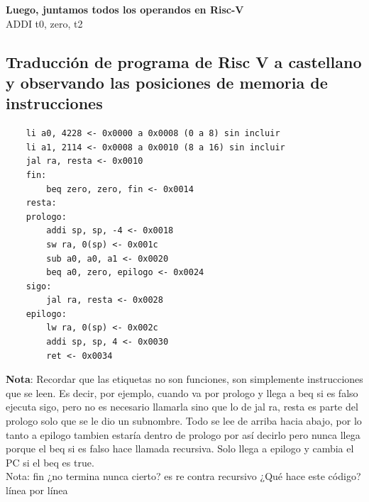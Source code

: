 \documentclass[10pt,a4paper]{article}
\begin{document}
\textbf{Luego, juntamos todos los operandos en Risc-V} \\ 
ADDI t0, zero, t2

\subsection*{Traducción de programa de Risc V a castellano y observando las posiciones de memoria de instrucciones}
\label{subsec:TPRVC}
\begin{lstlisting}
    li a0, 4228 <- 0x0000 a 0x0008 (0 a 8) sin incluir
    li a1, 2114 <- 0x0008 a 0x0010 (8 a 16) sin incluir
    jal ra, resta <- 0x0010
    fin: 
        beq zero, zero, fin <- 0x0014
    resta: 
    prologo:
        addi sp, sp, -4 <- 0x0018
        sw ra, 0(sp) <- 0x001c
        sub a0, a0, a1 <- 0x0020
        beq a0, zero, epilogo <- 0x0024
    sigo: 
        jal ra, resta <- 0x0028
    epilogo:
        lw ra, 0(sp) <- 0x002c
        addi sp, sp, 4 <- 0x0030
        ret <- 0x0034
\end{lstlisting}
\textbf{Nota}: Recordar que las etiquetas no son funciones, son simplemente instrucciones que se leen. Es decir, por ejemplo, cuando va por prologo y llega a beq si es falso ejecuta sigo, pero no es necesario llamarla sino que lo de jal ra, resta es parte del prologo solo que se le dio un subnombre. Todo se lee de arriba hacia abajo, por lo tanto a epilogo tambien estaría dentro de prologo por así decirlo pero nunca llega porque el beq si es falso hace llamada recursiva. Solo llega a epilogo y cambia el PC si el beq es true. \\ 
Nota: fin ¿no termina nunca cierto? es re contra recursivo
¿Qué hace este código? línea por línea
\end{document}
